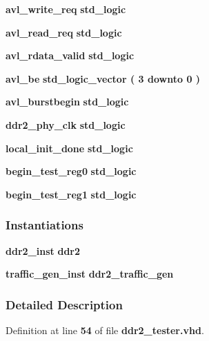 \begin{DoxyCompactItemize}
\item 
{\bf avl\+\_\+write\+\_\+req} {\bfseries \textcolor{comment}{std\+\_\+logic}\textcolor{vhdlchar}{ }} 
\item 
{\bf avl\+\_\+read\+\_\+req} {\bfseries \textcolor{comment}{std\+\_\+logic}\textcolor{vhdlchar}{ }} 
\item 
{\bf avl\+\_\+rdata\+\_\+valid} {\bfseries \textcolor{comment}{std\+\_\+logic}\textcolor{vhdlchar}{ }} 
\item 
{\bf avl\+\_\+be} {\bfseries \textcolor{comment}{std\+\_\+logic\+\_\+vector}\textcolor{vhdlchar}{ }\textcolor{vhdlchar}{(}\textcolor{vhdlchar}{ }\textcolor{vhdlchar}{ } \textcolor{vhdldigit}{3} \textcolor{vhdlchar}{ }\textcolor{keywordflow}{downto}\textcolor{vhdlchar}{ }\textcolor{vhdlchar}{ } \textcolor{vhdldigit}{0} \textcolor{vhdlchar}{ }\textcolor{vhdlchar}{)}\textcolor{vhdlchar}{ }} 
\item 
{\bf avl\+\_\+burstbegin} {\bfseries \textcolor{comment}{std\+\_\+logic}\textcolor{vhdlchar}{ }} 
\item 
{\bf ddr2\+\_\+phy\+\_\+clk} {\bfseries \textcolor{comment}{std\+\_\+logic}\textcolor{vhdlchar}{ }} 
\item 
{\bf local\+\_\+init\+\_\+done} {\bfseries \textcolor{comment}{std\+\_\+logic}\textcolor{vhdlchar}{ }} 
\item 
{\bf begin\+\_\+test\+\_\+reg0} {\bfseries \textcolor{comment}{std\+\_\+logic}\textcolor{vhdlchar}{ }} 
\item 
{\bf begin\+\_\+test\+\_\+reg1} {\bfseries \textcolor{comment}{std\+\_\+logic}\textcolor{vhdlchar}{ }} 
\end{DoxyCompactItemize}
\subsubsection*{Instantiations}
 \begin{DoxyCompactItemize}
\item 
{\bf ddr2\+\_\+inst}  {\bfseries ddr2}   
\item 
{\bf traffic\+\_\+gen\+\_\+inst}  {\bfseries ddr2\+\_\+traffic\+\_\+gen}   
\end{DoxyCompactItemize}


\subsubsection{Detailed Description}


Definition at line {\bf 54} of file {\bf ddr2\+\_\+tester.\+vhd}.



